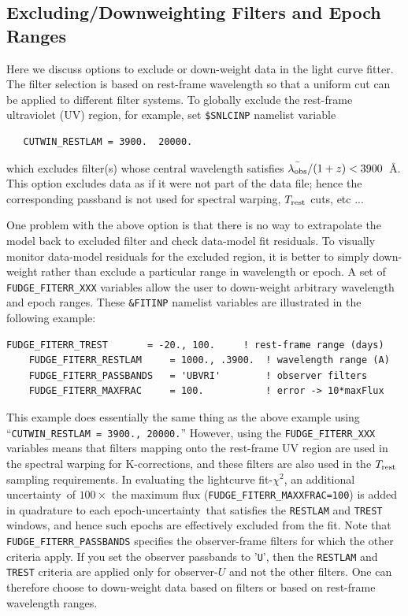 \documentclass[12pt]{article}
\newcommand{\unc}{uncertainty}
\newcommand{\Trest}{T_{\rm rest}}
\newcommand{\lamobs}{\lambda_{\rm obs}}
\begin{document}
   \clearpage
   \subsection{Excluding/Downweighting Filters and Epoch Ranges}
   \label{subsec:fitexclude}

Here we discuss options to exclude or down-weight data
in the light curve fitter.
The filter selection is based on rest-frame wavelength
so that a uniform cut can be applied to different filter systems.
To globally exclude the rest-frame ultraviolet (UV) region, 
for example,  set {\tt \$SNLCINP} namelist variable
%
\begin{verbatim}
   CUTWIN_RESTLAM = 3900.  20000.
\end{verbatim}
%
which excludes filter(s) whose central wavelength 
satisfies $\bar{\lamobs}/(1+z) < 3900$~\AA. This option
excludes data as if it were not part of the data file; 
hence the corresponding passband is not used for
spectral warping, $\Trest$ cuts, etc ...

One problem with the above option is that there is
no way to extrapolate the model back to excluded filter 
and check data-model fit residuals. To visually monitor
data-model residuals for the excluded region,
it is better to simply down-weight rather than exclude
a particular range in wavelength or epoch.
A set of {\tt FUDGE\_FITERR\_XXX} variables allow
the user to down-weight arbitrary wavelength and epoch ranges.
These {\tt \&FITINP} namelist variables are illustrated
in the following example:
%
\begin{Verbatim}[frame=single]
    FUDGE_FITERR_TREST       = -20., 100.     ! rest-frame range (days)
    FUDGE_FITERR_RESTLAM     = 1000., .3900.  ! wavelength range (A)
    FUDGE_FITERR_PASSBANDS   = 'UBVRI'        ! observer filters
    FUDGE_FITERR_MAXFRAC     = 100.           ! error -> 10*maxFlux
\end{Verbatim}
%
This example does essentially the same thing
as the above example using ``{\tt CUTWIN\_RESTLAM = 3900., 20000.}''
However, using the {\tt FUDGE\_FITERR\_XXX} variables means that
filters mapping onto the rest-frame UV region are used in the 
spectral warping for K-corrections, and these filters are also
used in the $\Trest$ sampling requirements.
In evaluating the lightcurve fit-$\chi^2$, 
an additional \unc\ of $100\times$ the maximum flux 
({\tt FUDGE\_FITERR\_MAXXFRAC=100})
is added in quadrature to each epoch-\unc\ that satisfies the 
{\tt RESTLAM} and {\tt TREST} windows, and hence such epochs
are effectively excluded from the fit.  Note that 
{\tt FUDGE\_FITERR\_PASSBANDS} specifies the observer-frame
filters for which the other criteria apply. If you set the
observer passbands to '{\tt U}', then the {\tt RESTLAM} and
{\tt TREST} criteria are applied only for observer-$U$
and not the other filters. One can therefore choose
to down-weight data based on filters or based on
rest-frame wavelength ranges.
\end{document}
